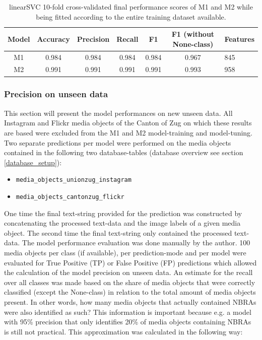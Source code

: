 \begin{table}[h]
\begin{center}
\caption{linearSVC 10-fold cross-validated final performance scores of M1 and M2 while being fitted according to the entire training dataset available.}\vspace{1ex}
\label{tab:m1_m2_linearSVC_final_scores}
\begin{tabular}{cccccc}\hline
Model & Accuracy & Precision & Recall & F1 & F1 (without None-class) & Features\\ \hline
M1 & 0.984 & 0.984 & 0.984 & 0.984 & 0.967 & 845\\
M2 & 0.991 & 0.991 & 0.991 & 0.991 & 0.993 & 958\\ \hline
\end{tabular}
\end{center}
\end{table}

\subsubsection{Precision on unseen data} \label{precision_unseen_data}
This section will present the model performances on new unseen data. All Instagram and Flickr media objects of the Canton of Zug on which these results are based were excluded from the M1 and M2 model-training and model-tuning. Two separate predictions per model were performed on the media objects contained in the following two database-tables (database overview see section \ref{database_setup}):

\begin{itemize}
    \item \texttt{media\_objects\_unionzug\_instagram} \item \texttt{media\_objects\_cantonzug\_flickr}
\end{itemize}

One time the final text-string provided for the prediction was constructed by concatenating the processed text-data and the image labels of a given media object. The second time the final text-string only contained the processed text-data. The model performance evaluation was done manually by the author. 100 media objects per class (if available), per prediction-mode and per model were evaluated for True Positive (TP) or False Positive (FP) predictions which allowed the calculation of the model precision on unseen data. An estimate for the recall over all classes was made based on the share of media objects that were correctly classified (except the None-class) in relation to the total amount of media objects present. In other words, how many media objects that actually contained NBRAs were also identified as such? This information is important because e.g. a model with 95\% precision that only identifies 20\% of media objects containing NBRAs is still not practical. This approximation was calculated in the following way:

